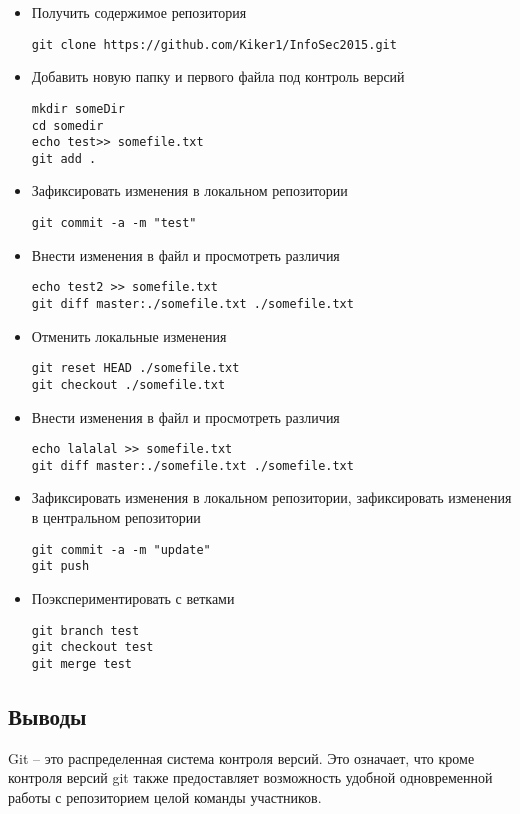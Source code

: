 \documentclass[a4paper, 12pt]{article}
\begin{document}
\begin{itemize}

\item{Получить содержимое репозитория
\begin{verbatim}git clone https://github.com/Kiker1/InfoSec2015.git 
\end{verbatim}}


\item{Добавить новую папку и первого файла под контроль версий
\begin{verbatim}
mkdir someDir
cd somedir
echo test>> somefile.txt
git add .
\end{verbatim}}

\item{Зафиксировать изменения в локальном репозитории
\begin{verbatim}
git commit -a -m "test" 
\end{verbatim}}

\item{Внести изменения в файл и просмотреть различия
\begin{verbatim}
echo test2 >> somefile.txt
git diff master:./somefile.txt ./somefile.txt
\end{verbatim}}

\item{Отменить локальные изменения
\begin{verbatim}
git reset HEAD ./somefile.txt
git checkout ./somefile.txt
\end{verbatim}}

\item{Внести изменения в файл и просмотреть различия
\begin{verbatim}
echo lalalal >> somefile.txt
git diff master:./somefile.txt ./somefile.txt
\end{verbatim}}

\item{Зафиксировать изменения в локальном репозитории, зафиксировать изменения в
центральном репозитории
\begin{verbatim}
git commit -a -m "update"
git push
\end{verbatim}}


\item{Поэкспериментировать с ветками
\begin{verbatim}
git branch test
git checkout test
git merge test
\end{verbatim}}
\end{itemize}

\subsection{Выводы}
Git -- это распределенная система контроля версий. Это означает, что кроме контроля версий git также предоставляет возможность удобной одновременной работы с репозиторием целой команды участников.
\end{document}
